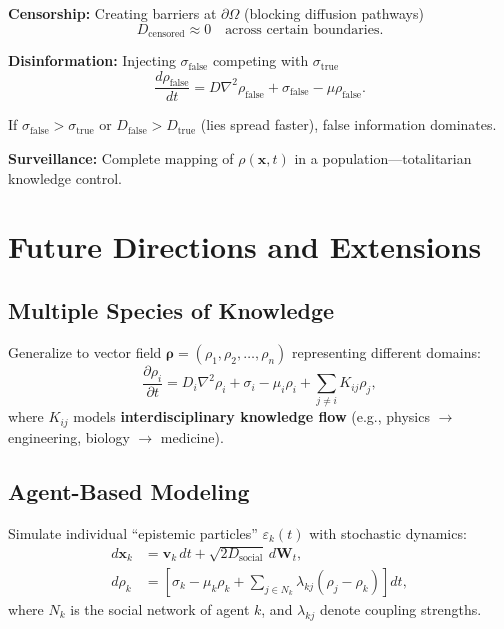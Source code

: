 \documentclass[12pt]{article}
\begin{document}
\textbf{Censorship:} Creating barriers at $\partial\Omega$ (blocking diffusion pathways)
\begin{equation}
    D_{\text{censored}} \approx 0 \quad \text{across certain boundaries}.
\end{equation}

\textbf{Disinformation:} Injecting $\sigma_{\text{false}}$ competing with $\sigma_{\text{true}}$
\begin{equation}
    \frac{d\rho_{\text{false}}}{dt} = D\nabla^2\rho_{\text{false}} + \sigma_{\text{false}} - \mu\rho_{\text{false}}.
\end{equation}

If $\sigma_{\text{false}} > \sigma_{\text{true}}$ or $D_{\text{false}} > D_{\text{true}}$ (lies spread faster), false information dominates.

\textbf{Surveillance:} Complete mapping of $\rho(\mathbf{x},t)$ in a population---totalitarian knowledge control.

\section{Future Directions and Extensions}

\subsection{Multiple Species of Knowledge}

Generalize to vector field $\boldsymbol{\rho} = (\rho_1, \rho_2, \ldots, \rho_n)$ representing different domains:
\begin{equation}
    \frac{\partial \rho_i}{\partial t} = D_i \nabla^2 \rho_i + \sigma_i - \mu_i \rho_i + \sum_{j \neq i} K_{ij} \rho_j,
\end{equation}
where $K_{ij}$ models \textbf{interdisciplinary knowledge flow} (e.g., physics $\to$ engineering, biology $\to$ medicine).

\subsection{Agent-Based Modeling}

Simulate individual ``epistemic particles'' $\varepsilon_k(t)$ with stochastic dynamics:
\begin{align}
    d\mathbf{x}_k &= \mathbf{v}_k\, dt + \sqrt{2D_{\text{social}}}\, d\mathbf{W}_t, \\
    d\rho_k &= \left[\sigma_k - \mu_k\rho_k + \sum_{j \in N_k} \lambda_{kj}(\rho_j - \rho_k)\right] dt,
\end{align}
where $N_k$ is the social network of agent $k$, and $\lambda_{kj}$ denote coupling strengths.
\end{document}
